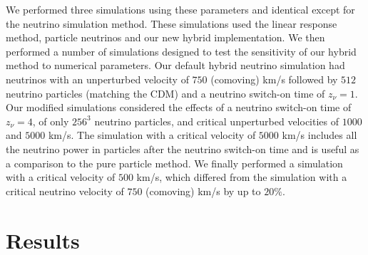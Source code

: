 \documentclass[useAMS, usenatbib]{mnras}
\begin{document}
We performed three simulations using these parameters and identical except for the neutrino simulation method. These simulations used the linear response method, particle neutrinos and our new hybrid implementation. We then performed a number of simulations designed to test the sensitivity of our hybrid method to numerical parameters. Our default hybrid neutrino simulation had neutrinos with an unperturbed velocity of $750$ (comoving) km/s followed by $512$ neutrino particles (matching the CDM) and a neutrino switch-on time of $z_\nu = 1$. Our modified simulations considered the effects of a neutrino switch-on time of $z_\nu = 4$, of only $256^3$ neutrino particles, and critical unperturbed velocities of $1000$ and $5000$ km/s. The simulation with a critical velocity of $5000$ km/s includes all the neutrino power in particles after the neutrino switch-on time and is useful as a comparison to the pure particle method. We finally performed a simulation with a critical velocity of $500$ km/s, which differed from the simulation with a critical neutrino velocity of $750$ (comoving) km/s by up to $20\%$.

\section{Results}
\label{sec:results}
\end{document}
